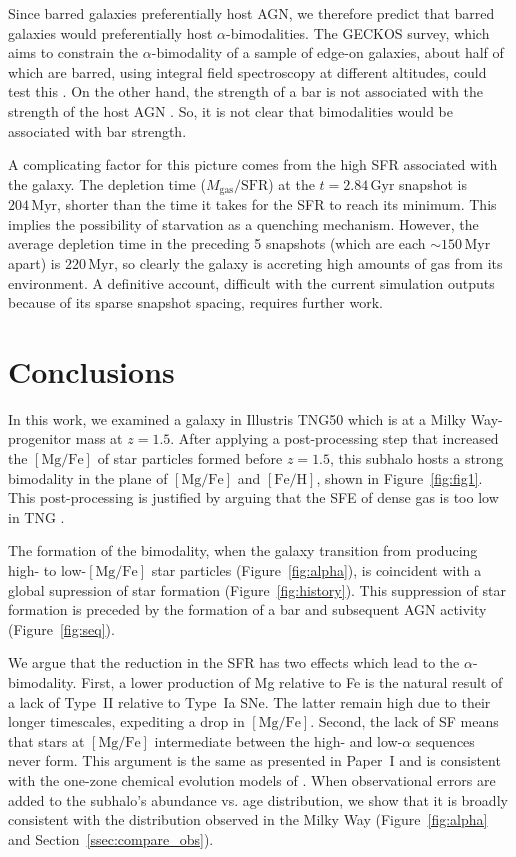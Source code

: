 \documentclass[twocolumn,linenumbers]{aastex631}
\newcommand{\Gyr}{\ensuremath{\textrm{Gyr}}}
\newcommand{\Myr}{\ensuremath{\textrm{Myr}}}
\newcommand{\FeH}{\ensuremath{[\textrm{Fe}/\textrm{H}]}}
\newcommand{\MgFe}{\ensuremath{[\textrm{Mg}/\textrm{Fe}]}}
\begin{document}
Since barred galaxies preferentially host AGN, we therefore predict that barred galaxies would preferentially host $\alpha$-bimodalities. The GECKOS survey, which aims to constrain the $\alpha$-bimodality of a sample of edge-on galaxies, about half of which are barred, using integral field spectroscopy at different altitudes, could test this \citep[and J. v.~d.~Sande, private communication]{2024IAUS..377...27V}. On the other hand, the strength of a bar is not associated with the strength of the host AGN \citep[e.g.]{2022A&A...661A.105S}. So, it is not clear that bimodalities would be associated with bar strength.

A complicating factor for this picture comes from the high SFR associated with the galaxy. The depletion time ($M_{\textrm{gas}}/\textrm{SFR}$) at the $t=2.84\,\Gyr$ snapshot is $204\,\Myr$, shorter than the time it takes for the SFR to reach its minimum. This implies the possibility of starvation as a quenching mechanism. However, the average depletion time in the preceding 5 snapshots (which are each $\sim150\,\Myr$ apart) is $220\,\Myr$, so clearly the galaxy is accreting high amounts of gas from its environment. A definitive account, difficult with the current simulation outputs because of its sparse snapshot spacing, requires further work.

\section{Conclusions}\label{sec:conc}
In this work, we examined a galaxy in Illustris TNG50 which is at a Milky Way-progenitor mass at $z=1.5$. After applying a post-processing step that increased the \MgFe{} of star particles formed before $z=1.5$, this subhalo hosts a strong bimodality in the plane of \MgFe{} and \FeH{}, shown in Figure~\ref{fig:fig1}. This post-processing is justified by arguing that the SFE of dense gas is too low in TNG \citep[][see discussion in our Section~\ref{ssec:sfe}]{2024arXiv240909121H}.

The formation of the bimodality, when the galaxy transition from producing high- to low-\MgFe{} star particles (Figure~\ref{fig:alpha}), is coincident with a global supression of star formation (Figure~\ref{fig:history}). This suppression of star formation is preceded by the formation of a bar and subsequent AGN activity (Figure~\ref{fig:seq}).

We argue that the reduction in the SFR has two effects which lead to the $\alpha$-bimodality. First, a lower production of Mg relative to Fe is the natural result of a lack of Type~II relative to Type~Ia SNe. The latter remain high due to their longer timescales, expediting a drop in \MgFe{}. Second, the lack of SF means that stars at \MgFe{} intermediate between the high- and low-$\alpha$ sequences never form. This argument is the same as presented in Paper~I and is consistent with the one-zone chemical evolution models of \citet{2020MNRAS.498.1364J}. When observational errors are added to the subhalo's abundance vs. age distribution, we show that it is broadly consistent with the distribution observed in the Milky Way (Figure~\ref{fig:alpha} and Section~\ref{ssec:compare_obs}).
\end{document}
